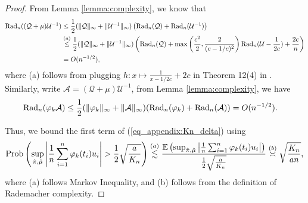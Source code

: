\begin{proof}
From Lemma \ref{lemma:complexity}, we know that
\begin{equation*}
\begin{split}
\text{Rad}_n((\mathcal{Q}+\mu)\mathcal{U}^{-1})
&\leq \frac{1}{2}(\|\mathcal{Q}\|_{\infty}+\|\mathcal{U}^{-1}\|_{\infty})\left( \text{Rad}_n(\mathcal{Q})+\text{Rad}_n(\mathcal{U}^{-1})\right)
\\&\overset{(a)}\leq
\frac{1}{2}(\|\mathcal{Q}\|_{\infty}+\|\mathcal{U}^{-1}\|_{\infty})\left( \text{Rad}_n(\mathcal{Q})+\max\left(\frac{c^2}{2},\frac{2}{(c-1/c)^2}\right)\text{Rad}_n(\mathcal{U}-\frac{1}{2c})+\frac{2c}{n}\right)
\\&=
O(n^{-1/2}),
\end{split}
\end{equation*}
where (a) follows from plugging $h:x\mapsto \frac{1}{x-1/2c}+2c$ in Theorem 12(4) in \cite{bartlett2002rademacher}.
Similarly, write $\mathcal{A}=(\mathcal{Q}+\mu)\mathcal{U}^{-1}$, from Lemma \ref{lemma:complexity}, we have
\begin{equation*}
\begin{split}
&\text{Rad}_n(\varphi_k\mathcal{A})
\leq 
\frac{1}{2}(\|\varphi_k\|_{\infty}+\|\mathcal{A}\|_{\infty})(\text{Rad}_n(\varphi_k)+\text{Rad}_n(\mathcal{A}))
=
O(n^{-1/2}).
\end{split}
\end{equation*}

Thus, we bound the first term of (\ref{eq_appendix:Kn_delta}) using 
\begin{align}\label{eq_appendix:uniformbound_qiang}
\Pr\left(\sup_{\hat{\pi},\hat\mu}\left|\frac{1}{n}\sum_{i=1}^n\varphi_k(t_i) u_i\right|>\frac{1}{2}\sqrt{\frac{a}{K_n}}\right)
\stackrel{(a)}{\lesssim}
\frac{\E\left(\sup_{\hat{\pi},\hat\mu}\left|\frac{1}{n}\sum_{i=1}^n\varphi_k(t_i) u_i\right|\right)}{\frac{1}{2}\sqrt{\frac{a}{K_n}}}
\overset{(b)}{\asymp} \sqrt{\frac{K_n}{an}},
\end{align}
where (a) follows Markov Inequality,
and (b) follows from the definition of Rademacher complexity.


\end{proof}
